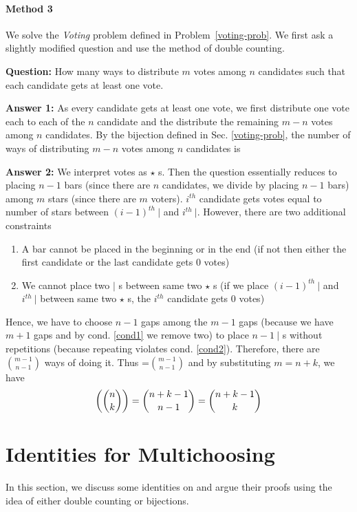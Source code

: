 \paragraph{Method 3} We solve the \emph{Voting} problem defined in Problem~\ref{voting-prob}. We first ask a slightly modified question and use the method of double counting.
\begin{description}
\item \textbf{Question:} How many ways to distribute $m$ votes among $n$ candidates such that each candidate gets at least one vote.
\item \textbf{Answer 1:} As every candidate gets at least one vote, we first distribute one vote each to each of the $n$ candidate and the distribute the remaining $m-n$ votes among $n$ candidates. By the bijection defined in Sec. \ref{voting-prob}, the number of ways of distributing $m-n$ votes among $n$ candidates is   
\item \textbf{Answer 2:} We interpret votes as $\star$ s. Then the question essentially reduces to placing $n-1$ bars (since there are $n$ candidates, we divide by placing $n-1$ bars) among $m$ stars (since there are $m$ voters). $i^{th}$ candidate gets votes equal to number of stars between $(i-1)^{th}~|$ and $i^{th}~|$. However, there are two additional constraints \begin{enumerate}
    \item\label{cond1} A bar cannot be placed in the beginning or in the end (if not then either the first candidate or the last candidate gets $0$ votes)
    \item\label{cond2} We cannot place two $|$ s between same two $\star$ s (if we place $(i-1)^{th}~|$ and $i^{th}~|$ between same two $\star$ s, the $i^{th}$ candidate gets $0$ votes)
\end{enumerate}
Hence, we have to choose $n-1$ gaps among the $m-1$ gaps (because we have $m+1$ gaps and by cond. \ref{cond1} we remove two) to place $n-1~|$ s without repetitions (because repeating violates cond. \ref{cond2}). Therefore, there are $\binom{m-1}{n-1}$ ways of doing it. Thus =$\binom{m-1}{n-1}$ and by substituting $m=n+k$, we have $$\textrm{$\left(\binom{n}{k}\right)$}=\binom{n+k-1}{n-1}=\binom{n+k-1}{k}$$
\end{description}
\section{Identities for Multichoosing}
In this section, we discuss some identities on  and argue their proofs using the idea of either double counting or bijections.
